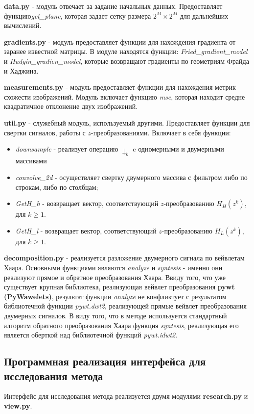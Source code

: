 \documentclass[oneside, final, 14pt]{article}
\begin{document}
\textbf{data.py} - модуль отвечает за задание начальных данных. Предоставляет функцию\textit{get\_plane}, которая задает сетку размера $2^M \times 2^M$ для дальнейших вычислений.

\textbf{gradients.py} - модуль предоставляет функции для нахождения градиента от заранее известной матрицы. В модуле находятся функции: \textit{Fried\_gradient\_model} и \textit{Hudgin\_gradien\_model}, которые возвращают градиенты по геометриям Фрайда и Хаджина.

\textbf{measurements.py} - модуль предоставляет функции для нахождения метрик схожести изображений.
Модуль включает функцию \textit{mse}, которая находит средне квадратичное отклонение двух изображений.

\textbf{util.py} - служебный модуль, используемый другими. Предоставляет функции для свертки сигналов, работы с $z$-преобразованиями. Включает в себя функции:
\begin{itemize}
\item  \textit{downsample} - реализует операцию $\downarrow_k$ c одномерными и двумерными массивами
\item \textit{convolve\_2d} - осуществляет свертку двумерного массива с фильтром либо по строкам, либо по столбцам;
\item \textit{GetH\_h} - возвращает вектор, соответствующий $z$-преобразованию $H_H(z^k)$, для $k         \geq 1$.
\item \textit{GetH\_l} - возвращает вектор, соответствующий $z$-преобразованию $H_L(z^k)$, для $k  \geq 1$.
\end{itemize}

\textbf{decomposition.py} - реализуется разложение двумерного сигнала по вейвлетам Хаара.
Основными функциями являются \textit{analyze} и \textit{syntesis} - именно они реализуют прямое и обратное преобразования Хаара. Ввиду того, что уже существует крупная библиотека, реализующая вейвлет преобразования \textbf{pywt (PyWawelets)}, результат функции \textit{analyze} не конфликтует с результатом библиотечной функции \textit{pywt.dwt2}, реализующей прямые вейвлет преобразования двумерных сигналов. В виду того, что в методе используется стандартный алгоритм обратного преобразования Хаара функция \textit{syntesis}, реализующая его является оберткой над библиотечной функций \textit{pywt.idwt2}.

\subsection{Программная реализация интерфейса для исследования метода}
Интерфейс для исследования метода реализуется двумя модулями \textbf{research.py} и \textbf{view.py}.
\end{document}
